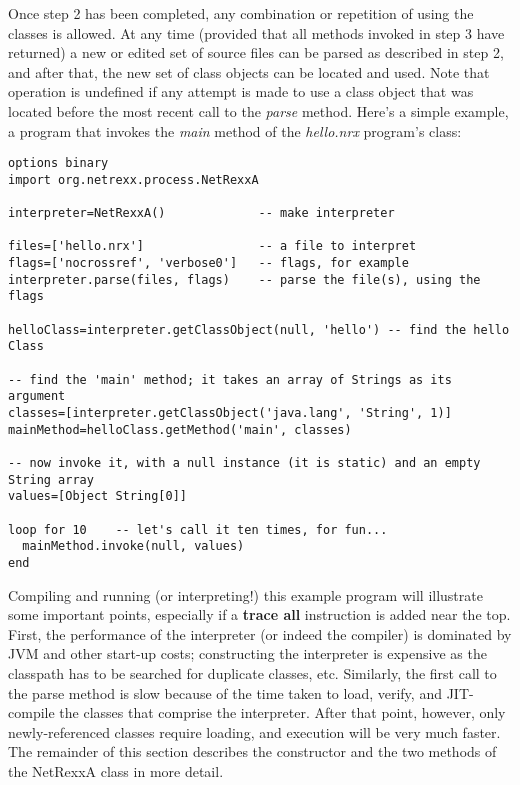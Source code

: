 Once step 2 has been completed, any combination or repetition of using
the classes is allowed.  At any time (provided that all methods invoked
in step 3 have returned) a new or edited set of source files can be
parsed as described in step 2, and after that, the new set of class
objects can be located and used.  Note that operation is undefined if
any attempt is made to use a class object that was located before the
most recent call to the \emph{parse} method.
\newline
Here's a simple example, a program that invokes the \emph{main} method
of the \emph{hello.nrx} program's class:
\begin{lstlisting}[label=netrexxa,caption=Try the NetRexxA interface]
options binary
import org.netrexx.process.NetRexxA

interpreter=NetRexxA()             -- make interpreter

files=['hello.nrx']                -- a file to interpret
flags=['nocrossref', 'verbose0']   -- flags, for example
interpreter.parse(files, flags)    -- parse the file(s), using the flags

helloClass=interpreter.getClassObject(null, 'hello') -- find the hello Class

-- find the 'main' method; it takes an array of Strings as its argument
classes=[interpreter.getClassObject('java.lang', 'String', 1)]
mainMethod=helloClass.getMethod('main', classes)

-- now invoke it, with a null instance (it is static) and an empty String array
values=[Object String[0]]

loop for 10    -- let's call it ten times, for fun...
  mainMethod.invoke(null, values)
end
\end{lstlisting}

Compiling and running (or interpreting!) this example program will
illustrate some important points, especially if a \textbf{trace all}
instruction is added near the top.  First, the performance of the
interpreter (or indeed the compiler) is dominated by JVM and other
start-up costs; constructing the interpreter is expensive as the
classpath has to be searched for duplicate classes, etc.  Similarly,
the first call to the parse method is slow because of the time taken to
load, verify, and JIT-compile the classes that comprise the interpreter.
After that point, however, only newly-referenced classes require
loading, and execution will be very much faster.
\newline
The remainder of this section describes the constructor and the two
methods of the NetRexxA class in more detail.
